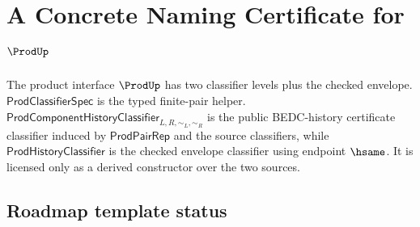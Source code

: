 \chapter{A Concrete Naming Certificate for \(\ProdUp\)}
\label{ch:concrete-instances-prod-namecert}

The product interface $\ProdUp$ has two classifier levels plus the checked envelope. $\mathsf{ProdClassifierSpec}$ is the typed finite-pair helper. $\mathsf{ProdComponentHistoryClassifier}_{L,R,\sim_L,\sim_R}$ is the public BEDC-history certificate classifier induced by $\mathsf{ProdPairRep}$ and the source classifiers, while $\mathsf{ProdHistoryClassifier}$ is the checked envelope classifier using endpoint $\hsame$. It is licensed only as a derived constructor over the two sources.

\section{Roadmap template status}

